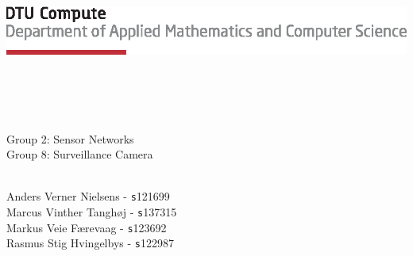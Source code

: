 
\begin{titlepage}
\null
\includegraphics[scale=1]{figures/tex_dtu_compute_a_uk}\\[10pt]
\addtolength{\wpXoffset}{-6cm}
\addtolength{\wpYoffset}{-10cm}


{\huge\bfseries \COURSE}\\\ \\
{\LARGE\bfseries \TITLE }\\\ \\
Group 2: Sensor Networks\\
Group 8: Surveillance Camera\\
\ \\
{\DATE}

\vspace{140pt}

Anders Verner Nielsens - {\texttt s121699}\\
Marcus Vinther Tanghøj - {\texttt s137315}\\
Markus Veie Færevaag - {\texttt s123692}\\
Rasmus Stig Hvingelbys - {\texttt s122987} \\
\\
[3cm]
\end{titlepage}

\newpage
